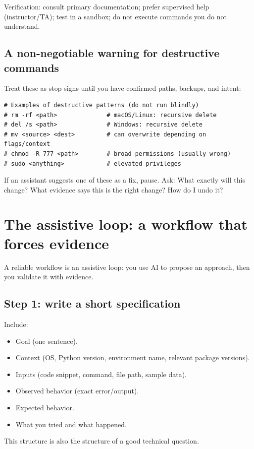 Verification: consult primary documentation; prefer supervised help (instructor/TA); test in a sandbox; do not execute commands you do not understand.

\subsection{A non-negotiable warning for destructive commands}
Treat these as stop signs until you have confirmed paths, backups, and intent:

\begin{verbatim}
# Examples of destructive patterns (do not run blindly)
# rm -rf <path>              # macOS/Linux: recursive delete
# del /s <path>              # Windows: recursive delete
# mv <source> <dest>         # can overwrite depending on flags/context
# chmod -R 777 <path>        # broad permissions (usually wrong)
# sudo <anything>            # elevated privileges
\end{verbatim}

If an assistant suggests one of these as a fix, pause. Ask: What exactly will this change? What evidence says this is the right change? How do I undo it?

\section{The assistive loop: a workflow that forces evidence}
A reliable workflow is an assistive loop: you use AI to propose an approach, then you validate it with evidence.

\subsection{Step 1: write a short specification}
Include:
\begin{itemize}[noitemsep]
  \item Goal (one sentence).
  \item Context (OS, Python version, environment name, relevant package versions).
  \item Inputs (code snippet, command, file path, sample data).
  \item Observed behavior (exact error/output).
  \item Expected behavior.
  \item What you tried and what happened.
\end{itemize}

This structure is also the structure of a good technical question.

